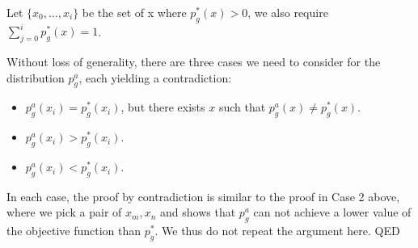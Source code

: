 Let $\{ x_0, \ldots, x_i \}$ be the set of x where $p^*_{g} (x) > 0$, we also require $\sum_{j=0}^i p^*_{g} (x) = 1 $.

Without loss of generality, there are three cases we need to consider for the distribution $p^a_g$, each yielding a contradiction:
\begin{itemize}
    \item $p^a_g (x_i) = p^*_g(x_i)$, but there exists $x$ such that $p^a_g (x) \neq p^*_g(x)$.
    \item $p^a_g (x_i) > p^*_g(x_i)$.
    \item $p^a_g (x_i) < p^*_g(x_i)$.
\end{itemize} 
In each case, the proof by contradiction is similar to the proof in Case 2 above, where we pick a pair of $x_m, x_n$ and shows that $p^a_g$ can not achieve a lower value of the objective function than $p^*_g$. We thus do not repeat the argument here. QED


